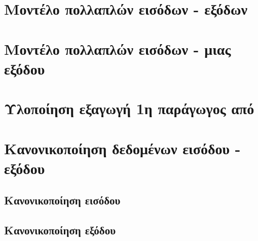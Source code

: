 \section{Μοντέλο πολλαπλών εισόδων - εξόδων}

\section{Μοντέλο πολλαπλών εισόδων - μιας εξόδου}

\section{Υλοποίηση εξαγωγή  1η παράγωγος από }

\section{Κανονικοποίηση δεδομένων εισόδου - εξόδου}

\subsection{Κανονικοποίηση εισόδου}

\subsection{Κανονικοποίηση εξόδου}
